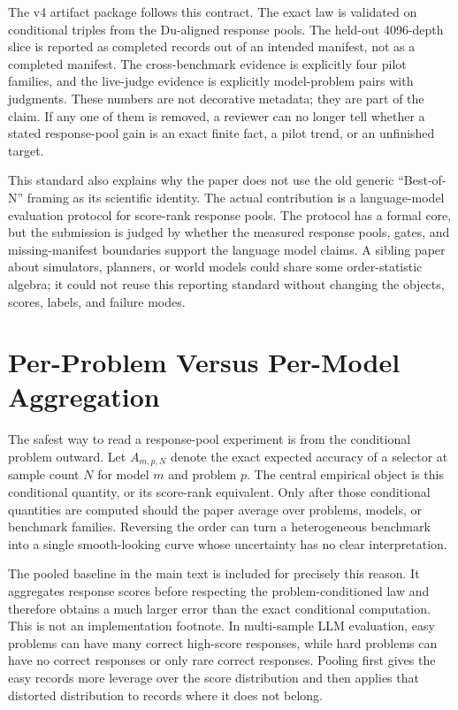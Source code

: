 The v4 artifact package follows this contract. The exact law is validated on
\EvidenceTriples{} conditional triples from the Du-aligned response pools. The
held-out 4096-depth slice is reported as \EvidenceHeldoutRecords{} completed
records out of an intended \EvidenceHeldoutRequiredRecords{} manifest, not as a
completed manifest. The cross-benchmark evidence is explicitly four pilot
families, and the live-judge evidence is explicitly \EvidenceLiveJudgePairs{}
model-problem pairs with \EvidenceLiveJudgeJudgments{} judgments. These numbers
are not decorative metadata; they are part of the claim. If any one of them is
removed, a reviewer can no longer tell whether a stated response-pool gain is
an exact finite fact, a pilot trend, or an unfinished target.

This standard also explains why the paper does not use the old generic
``Best-of-N'' framing as its scientific identity. The actual contribution is a
language-model evaluation protocol for score-rank response pools. The protocol
has a formal core, but the submission is judged by whether the measured
response pools, gates, and missing-manifest boundaries support the language
model claims. A sibling paper about simulators, planners, or world models
could share some order-statistic algebra; it could not reuse this reporting
standard without changing the objects, scores, labels, and failure modes.

\section{Per-Problem Versus Per-Model Aggregation}
\label{app:aggregation}

The safest way to read a response-pool experiment is from the conditional
problem outward. Let $A_{m,p,N}$ denote the exact expected accuracy of a
selector at sample count $N$ for model $m$ and problem $p$. The central
empirical object is this conditional quantity, or its score-rank equivalent.
Only after those conditional quantities are computed should the paper average
over problems, models, or benchmark families. Reversing the order can turn a
heterogeneous benchmark into a single smooth-looking curve whose uncertainty
has no clear interpretation.

The pooled baseline in the main text is included for precisely this reason. It
aggregates response scores before respecting the problem-conditioned law and
therefore obtains a much larger error than the exact conditional computation.
This is not an implementation footnote. In multi-sample LLM evaluation, easy
problems can have many correct high-score responses, while hard problems can
have no correct responses or only rare correct responses. Pooling first gives
the easy records more leverage over the score distribution and then applies
that distorted distribution to records where it does not belong.

